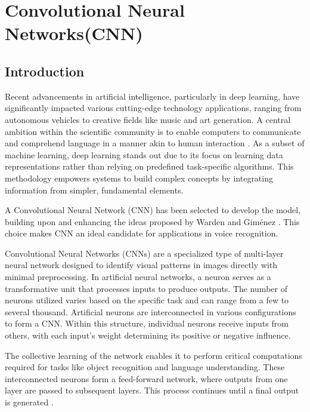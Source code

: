 %
%


\chapter{Convolutional Neural Networks(CNN)}

\section{Introduction}

Recent advancements in artificial intelligence, particularly in deep learning, have significantly impacted various cutting-edge technology applications, ranging from autonomous vehicles to creative fields like music and art generation. A central ambition within the scientific community is to enable computers to communicate and comprehend language in a manner akin to human interaction \cite{Li:2021}. As a subset of machine learning, deep learning stands out due to its focus on learning data representations rather than relying on predefined task-specific algorithms. This methodology empowers systems to build complex concepts by integrating information from simpler, fundamental elements.

A Convolutional Neural Network (CNN) has been selected to develop the model, building upon and enhancing the ideas proposed by Warden and Giménez \cite{Warden:2020}. This choice makes CNN an ideal candidate for applications in voice recognition.

Convolutional Neural Networks (CNNs) are a specialized type of multi-layer neural network designed to identify visual patterns in images directly with minimal preprocessing. In artificial neural networks, a neuron serves as a transformative unit that processes inputs to produce outputs. The number of neurons utilized varies based on the specific task and can range from a few to several thousand. Artificial neurons are interconnected in various configurations to form a CNN. Within this structure, individual neurons receive inputs from others, with each input's weight determining its positive or negative influence. 

The collective learning of the network enables it to perform critical computations required for tasks like object recognition and language understanding. These interconnected neurons form a feed-forward network, where outputs from one layer are passed to subsequent layers. This process continues until a final output is generated \cite{Gu:2018}.


